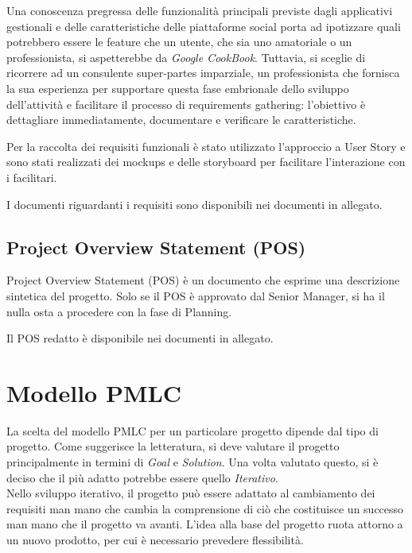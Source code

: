 Una conoscenza pregressa delle funzionalità principali previste dagli applicativi gestionali e delle caratteristiche delle 
piattaforme social porta ad ipotizzare quali potrebbero essere le feature che un utente, che sia uno amatoriale o un 
professionista, si aspetterebbe da \textit{Google CookBook}.
Tuttavia, si sceglie di ricorrere ad un consulente super-partes imparziale, un professionista che fornisca la sua esperienza 
per supportare questa fase embrionale dello sviluppo dell'attività e facilitare il processo di requirements gathering: 
l'obiettivo è dettagliare immediatamente, documentare e verificare le caratteristiche.

Per la raccolta dei requisiti funzionali è stato utilizzato l'approccio a User Story e sono stati realizzati dei mockups e 
delle storyboard per facilitare l'interazione con i facilitari.

I documenti riguardanti i requisiti sono disponibili nei documenti in allegato.

\subsection{Project Overview Statement (POS)}

Project Overview Statement (POS) è un documento che esprime una descrizione sintetica del progetto.
Solo se il POS è approvato dal Senior Manager, si ha il nulla osta a procedere con la fase di Planning.

Il POS redatto è disponibile nei documenti in allegato.


\section{Modello PMLC}
La scelta del modello PMLC per un particolare progetto dipende dal tipo di progetto.
Come suggerisce la letteratura, si deve valutare il progetto principalmente in termini di \textit{Goal} e 
\textit{Solution}.
Una volta valutato questo, si è deciso che il più adatto potrebbe essere quello \textit{Iterativo}.\\
Nello sviluppo iterativo, il progetto può essere adattato al cambiamento dei requisiti man mano che cambia 
la comprensione di ciò che costituisce un successo man mano che il progetto va avanti.
L'idea alla base del progetto ruota attorno a un nuovo prodotto, per cui è necessario prevedere flessibilità.
